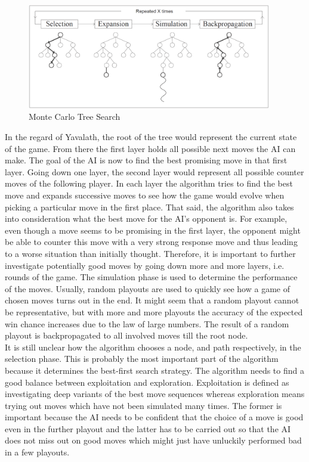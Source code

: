 \documentclass[english]{report}
\begin{document}
\begin{figure}[ht]
\centering
\includegraphics[width=0.95\textwidth]{Abbildungen/MonteCarloTreeSearch.png}
\caption[Monte Carlo Tree Search, Source:\cite{paper:mcts}]{Monte Carlo Tree Search}
\label{fig:mcts}
\end{figure}

In the regard of Yavalath, the root of the tree would represent the current
state of the game. From there the first layer holds all possible next moves the
AI can make. The goal of the AI is now to find the best promising move in that
first layer. Going down one layer, the second layer would represent all possible
counter moves of the following player. In each layer the algorithm tries to find
the best move and expands successive moves to see how the game would evolve when
picking a particular move in the first place. That said, the algorithm also
takes into consideration what the best move for the AI's opponent is. For example,
even though a move seems to be promising in the first layer, the opponent might
be able to counter this move with a very strong response move and thus leading
to a worse situation than initially thought. Therefore, it is important to
further investigate potentially good moves by going down more and more layers,
i.e. rounds of the game. The simulation phase is used to determine the
performance of the moves. Usually, random playouts are used to quickly see how a
game of chosen moves turns out in the end. It might seem that a random playout
cannot be representative, but with more and more playouts the accuracy of the
expected win chance increases due to the law of large numbers.
The result of a random playout is backpropagated to all involved moves till the
root node.\\

It is still unclear how the algorithm chooses a node, and path
respectively, in the selection phase. This is probably the most important part
of the algorithm because it determines the best-first search strategy. The
algorithm needs to find a good balance between exploitation and exploration.
Exploitation is defined as investigating deep variants of the best move sequences
whereas exploration means trying out moves which have not been simulated many
times. The former is important because the AI needs to be confident that the
choice of a move is good even in the further playout and the latter has to be
carried out so that the AI does not miss out on good moves which might just have
unluckily performed bad in a few playouts.\\
\end{document}
